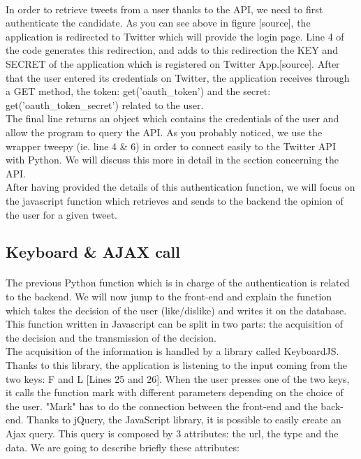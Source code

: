 \paragraph{}
In order to retrieve tweets from a user thanks to the API, we need to first authenticate the candidate. As you can see above in figure [source], the application is redirected to Twitter which will provide the login page. Line 4 of the code generates this redirection, and adds to this redirection the KEY and SECRET of the application which is registered on Twitter App.[source]. After that the user entered its credentials on Twitter, the application receives through a GET method, the token: get('oauth\_token') and the secret: get('oauth\_token\_secret') related to the user. \\
The final line returns an object which contains the credentials of the user and allow the program to query the API. As you probably noticed, we use the wrapper tweepy (ie. line 4 \& 6) in order to connect easily to the Twitter API with Python. We will discuss this more in detail in the section concerning the API. \\
After having provided the details of this authentication function, we will focus on the javascript function which retrieves and sends to the backend the opinion of the user for a given tweet.

\subsection{Keyboard \& AJAX call}

\paragraph{}
The previous Python function which is in charge of the authentication is related to the backend. We will now jump to the front-end and explain the function which takes the decision of the user (like/dislike) and writes it on the database. This function written in Javascript can be split in two parts: the acquisition of the decision and the transmission of the decision.  \\
The acquisition of the information is handled by a library called KeyboardJS. Thanks to this library, the application is listening to the input coming from the two keys: F and L [Lines 25 and 26]. When the user presses one of the two keys, it calls the function mark with different parameters depending on the choice of the user. "Mark" has to do the connection between the front-end and the back-end. Thanks to jQuery, the JavaScript library, it is possible to easily create an Ajax query. This query is composed by 3 attributes: the url, the type and the data. We are going to describe briefly these attributes:


